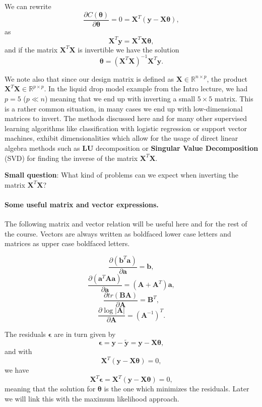 \documentclass[%
oneside,                 %
final,                   %
10pt]{article}
\newenvironment{block_mdfboxadmon}[1][]{
\begin{block_mdfboxmdframed}[frametitle=#1]
}
{
\end{block_mdfboxmdframed}
}
\begin{document}
\begin{block_mdfboxadmon}[]
We can rewrite
\[
\frac{\partial C(\bm{\theta})}{\partial \bm{\theta}} = 0 = \bm{X}^T\left( \bm{y}-\bm{X}\bm{\theta}\right),  
\]
as
\[
\bm{X}^T\bm{y} = \bm{X}^T\bm{X}\bm{\theta},  
\]
and if the matrix $\bm{X}^T\bm{X}$ is invertible we have the solution
\[
\bm{\theta} =\left(\bm{X}^T\bm{X}\right)^{-1}\bm{X}^T\bm{y}.
\]

We note also that since our design matrix is defined as $\bm{X}\in
{\mathbb{R}}^{n\times p}$, the product $\bm{X}^T\bm{X} \in
{\mathbb{R}}^{p\times p}$.  In the liquid drop model example from the Intro lecture, we had $p=5$ ($p \ll n$) meaning that we end up with inverting a small
$5\times 5$ matrix. This is a rather common situation, in many cases we end up with low-dimensional
matrices to invert. The methods discussed here and for many other
supervised learning algorithms like classification with logistic
regression or support vector machines, exhibit dimensionalities which
allow for the usage of direct linear algebra methods such as \textbf{LU} decomposition or \textbf{Singular Value Decomposition} (SVD) for finding the inverse of the matrix
$\bm{X}^T\bm{X}$.
\end{block_mdfboxadmon} %




\begin{block_mdfboxadmon}[]
\textbf{Small question}: What kind of problems can we expect when inverting the matrix  $\bm{X}^T\bm{X}$?
\end{block_mdfboxadmon} %



\paragraph{Some useful matrix and vector expressions.}
The following matrix and vector relation will be useful here and for the rest of the course. Vectors are always written as boldfaced lower case letters and 
matrices as upper case boldfaced letters. 

\[
\frac{\partial (\bm{b}^T\bm{a})}{\partial \bm{a}} = \bm{b},
\]
\[
\frac{\partial (\bm{a}^T\bm{A}\bm{a})}{\partial \bm{a}} = (\bm{A}+\bm{A}^T)\bm{a},
\]
\[
\frac{\partial tr(\bm{B}\bm{A})}{\partial \bm{A}} = \bm{B}^T,
\]
\[
\frac{\partial \log{\vert\bm{A}\vert}}{\partial \bm{A}} = (\bm{A}^{-1})^T.
\]


\begin{block_mdfboxadmon}[]
The residuals $\bm{\epsilon}$ are in turn given by
\[
\bm{\epsilon} = \bm{y}-\bm{\tilde{y}} = \bm{y}-\bm{X}\bm{\theta},
\]
and with 
\[
\bm{X}^T\left( \bm{y}-\bm{X}\bm{\theta}\right)= 0, 
\]
we have
\[
\bm{X}^T\bm{\epsilon}=\bm{X}^T\left( \bm{y}-\bm{X}\bm{\theta}\right)= 0, 
\]
meaning that the solution for $\bm{\theta}$ is the one which minimizes the residuals.  Later we will link this with the maximum likelihood approach.
\end{block_mdfboxadmon} %
\end{document}
